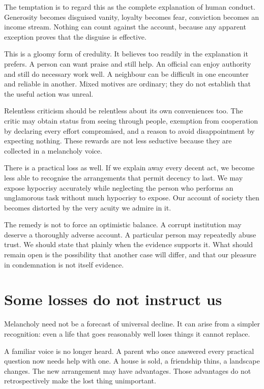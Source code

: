 \documentclass[12pt,a4paper]{book}
\begin{document}
The temptation is to regard this as the complete explanation of human conduct. Generosity becomes disguised vanity, loyalty becomes fear, conviction becomes an income stream. Nothing can count against the account, because any apparent exception proves that the disguise is effective.

This is a gloomy form of credulity. It believes too readily in the explanation it prefers. A person can want praise and still help. An official can enjoy authority and still do necessary work well. A neighbour can be difficult in one encounter and reliable in another. Mixed motives are ordinary; they do not establish that the useful action was unreal.

Relentless criticism should be relentless about its own conveniences too. The critic may obtain status from seeing through people, exemption from cooperation by declaring every effort compromised, and a reason to avoid disappointment by expecting nothing. These rewards are not less seductive because they are collected in a melancholy voice.

There is a practical loss as well. If we explain away every decent act, we become less able to recognise the arrangements that permit decency to last. We may expose hypocrisy accurately while neglecting the person who performs an unglamorous task without much hypocrisy to expose. Our account of society then becomes distorted by the very acuity we admire in it.

The remedy is not to force an optimistic balance. A corrupt institution may deserve a thoroughly adverse account. A particular person may repeatedly abuse trust. We should state that plainly when the evidence supports it. What should remain open is the possibility that another case will differ, and that our pleasure in condemnation is not itself evidence.

\section*{Some losses do not instruct us}

Melancholy need not be a forecast of universal decline. It can arise from a simpler recognition: even a life that goes reasonably well loses things it cannot replace.

A familiar voice is no longer heard. A parent who once answered every practical question now needs help with one. A house is sold, a friendship thins, a landscape changes. The new arrangement may have advantages. Those advantages do not retrospectively make the lost thing unimportant.
\end{document}
